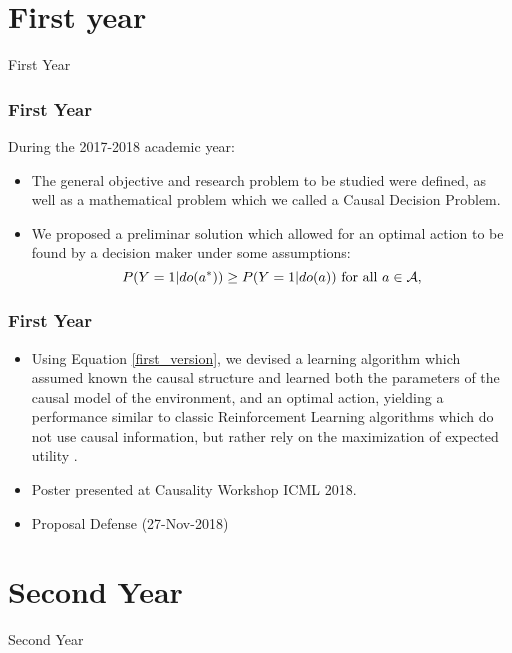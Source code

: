 \documentclass{beamer}
\theoremstyle{plain}
\begin{document}
\section{First year}
\begin{frame}
\begin{center}
\LARGE{First Year}
\end{center}
\end{frame}

\begin{frame}
\frametitle{First Year}
During the 2017-2018 academic year:
\begin{itemize}
\item The general objective and research problem to be studied were defined, as well as a mathematical problem which we called a Causal Decision Problem.
\item We proposed a preliminar solution which allowed for an optimal action to be found by a decision maker under some assumptions:
\begin{equation}{\label{first_version}}
P(Y=1 | do(a^\ast)) \geq P(Y=1 | do(a)) \textrm{ for all } a \in \mathcal{A},
\end{equation}
\end{itemize}
\end{frame}

\begin{frame}
\frametitle{First Year}
\begin{itemize}
\item Using Equation \ref{first_version}, we devised a learning algorithm which assumed known the causal structure and learned both the parameters of the causal model of the environment, and an optimal action, yielding a performance similar to classic Reinforcement Learning algorithms which do not use causal information, but rather rely on the maximization of expected utility \citep{gonzalez2018playing}.
\item Poster presented at Causality Workshop ICML 2018.
\item Proposal Defense (27-Nov-2018)
\end{itemize}
\end{frame}

\section{Second Year}
\begin{frame}
\begin{center}
\LARGE{Second Year}
\end{center}
\end{frame}
\end{document}
